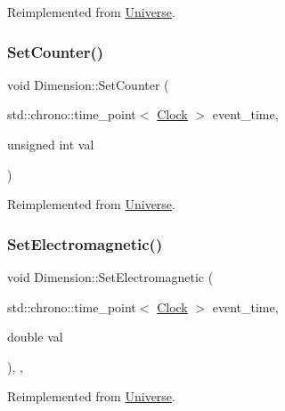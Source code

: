 Reimplemented from \mbox{\hyperlink{classUniverse_a3b3da7c86a7b75e5e5c0b7972ac82a87}{Universe}}.

\mbox{\label{classDimension_a75c6a1a1e09c40b5860dc11a83384d9f}} 
\subsubsection{\texorpdfstring{Set\+Counter()}{SetCounter()}}
{\footnotesize\ttfamily void Dimension\+::\+Set\+Counter (\begin{DoxyParamCaption}\item[{std\+::chrono\+::time\+\_\+point$<$ \mbox{\hyperlink{universe_8h_a0ef8d951d1ca5ab3cfaf7ab4c7a6fd80}{Clock}} $>$}]{event\+\_\+time,  }\item[{unsigned int}]{val }\end{DoxyParamCaption})\hspace{0.3cm}{\ttfamily [virtual]}}



Reimplemented from \mbox{\hyperlink{classUniverse_aa22202ae740eb1355529afcb13285e91}{Universe}}.

\mbox{\label{classDimension_ad8c18ce6358904e01594092dca9f1311}} 
\subsubsection{\texorpdfstring{Set\+Electromagnetic()}{SetElectromagnetic()}}
{\footnotesize\ttfamily void Dimension\+::\+Set\+Electromagnetic (\begin{DoxyParamCaption}\item[{std\+::chrono\+::time\+\_\+point$<$ \mbox{\hyperlink{universe_8h_a0ef8d951d1ca5ab3cfaf7ab4c7a6fd80}{Clock}} $>$}]{event\+\_\+time,  }\item[{double}]{val }\end{DoxyParamCaption})\hspace{0.3cm}{\ttfamily [inline]}, {\ttfamily [final]}, {\ttfamily [virtual]}}



Reimplemented from \mbox{\hyperlink{classUniverse_aa981fc7e252b1fbbb675f0371860954d}{Universe}}.

